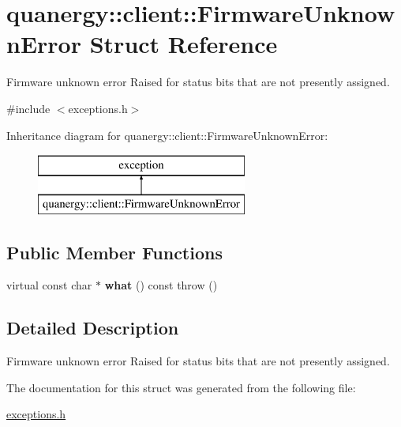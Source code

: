 \hypertarget{structquanergy_1_1client_1_1FirmwareUnknownError}{\section{quanergy\-:\-:client\-:\-:Firmware\-Unknown\-Error Struct Reference}
\label{structquanergy_1_1client_1_1FirmwareUnknownError}
}


Firmware unknown error Raised for status bits that are not presently assigned.  




{\ttfamily \#include $<$exceptions.\-h$>$}

Inheritance diagram for quanergy\-:\-:client\-:\-:Firmware\-Unknown\-Error\-:\begin{figure}[H]
\begin{center}
\leavevmode
\includegraphics[height=2.000000cm]{structquanergy_1_1client_1_1FirmwareUnknownError}
\end{center}
\end{figure}
\subsection*{Public Member Functions}
\begin{DoxyCompactItemize}
\item 
\hypertarget{structquanergy_1_1client_1_1FirmwareUnknownError_acba47387e1d8c8b87aca0b0a6e95fc04}{virtual const char $\ast$ {\bfseries what} () const   throw ()}\label{structquanergy_1_1client_1_1FirmwareUnknownError_acba47387e1d8c8b87aca0b0a6e95fc04}

\end{DoxyCompactItemize}


\subsection{Detailed Description}
Firmware unknown error Raised for status bits that are not presently assigned. 

The documentation for this struct was generated from the following file\-:\begin{DoxyCompactItemize}
\item 
\hyperlink{exceptions_8h}{exceptions.\-h}\end{DoxyCompactItemize}
